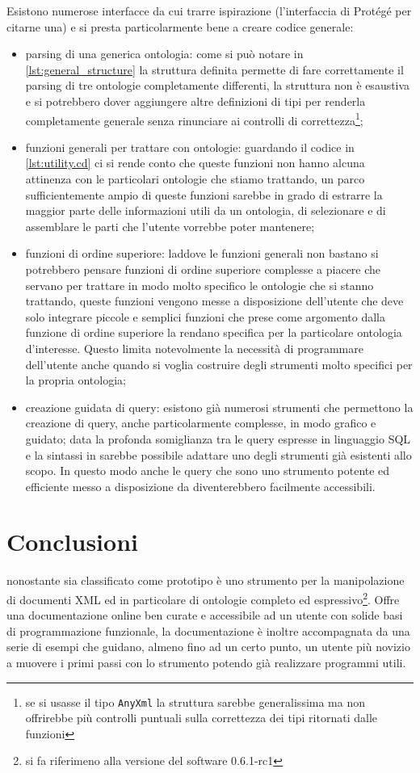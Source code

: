 Esistono numerose interfacce da cui trarre ispirazione (l'interfaccia di Protégé per citarne una) e \cduce si presta particolarmente bene a creare codice generale:
\begin{itemize}
	\item parsing di una generica ontologia: come si può notare in \ref{lst:general_structure} la struttura definita permette di fare correttamente il parsing di tre ontologie completamente differenti, la struttura non è esaustiva e si potrebbero dover aggiungere altre definizioni di tipi per renderla completamente generale senza rinunciare ai controlli di correttezza\footnote{se si usasse il tipo \texttt{AnyXml} la struttura sarebbe generalissima ma non offrirebbe più controlli puntuali sulla correttezza dei tipi ritornati dalle funzioni};
	\item funzioni generali per trattare con ontologie: guardando il codice in \ref{lst:utility.cd} ci si rende conto che queste funzioni non hanno alcuna attinenza con le particolari ontologie che stiamo trattando, un parco sufficientemente ampio di queste funzioni sarebbe in grado di estrarre la maggior parte delle informazioni utili da un ontologia, di selezionare e di assemblare le parti che l'utente vorrebbe poter mantenere;
	\item\label{ch5.4_func}funzioni di ordine superiore: laddove le funzioni generali non bastano si potrebbero pensare funzioni di ordine superiore complesse a piacere che servano per trattare in modo molto specifico le ontologie che si stanno trattando, queste funzioni vengono messe a disposizione dell'utente che deve solo integrare piccole e semplici funzioni che prese come argomento dalla funzione di ordine superiore la rendano specifica per la particolare ontologia d'interesse. Questo limita notevolmente la necessità di programmare dell'utente anche quando si voglia costruire degli strumenti molto specifici per la propria ontologia;
	\item creazione guidata di query: esistono già numerosi strumenti che permettono la creazione di query, anche particolarmente complesse, in modo grafico e guidato; data la profonda somiglianza tra le query espresse in linguaggio SQL e la sintassi in \cduce sarebbe possibile adattare uno degli strumenti già esistenti allo scopo. In questo modo anche le query che sono uno strumento potente ed efficiente messo a disposizione da \cduce diventerebbero facilmente accessibili.	
\end{itemize}
\section{Conclusioni}
\cduce nonostante sia classificato come prototipo è uno strumento per la manipolazione di documenti XML ed in particolare di ontologie completo ed espressivo\footnote{si fa riferimeno alla versione del software 0.6.1-rc1}. Offre una documentazione online ben curate e accessibile ad un utente con solide basi di programmazione funzionale, la documentazione è inoltre accompagnata da una serie di esempi che guidano, almeno fino ad un certo punto, un utente più novizio a muovere i primi passi con lo strumento potendo già realizzare programmi utili.

